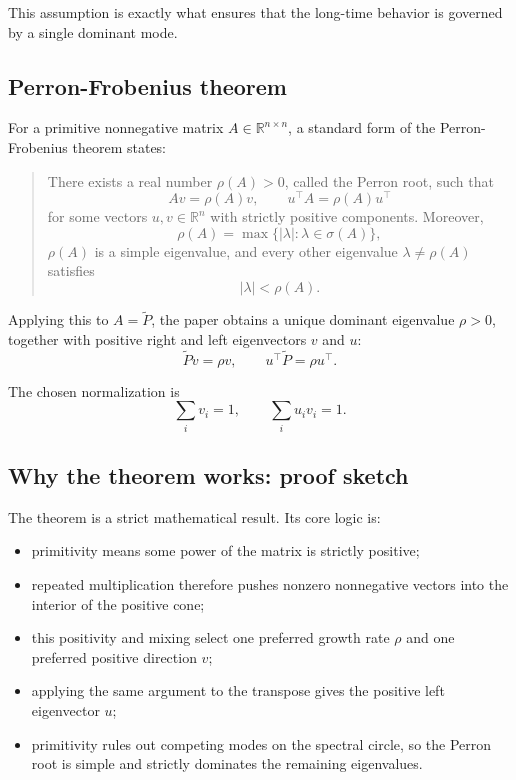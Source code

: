 \documentclass[11pt]{article}
\begin{document}
This assumption is exactly what ensures that the long-time behavior is governed by a single
dominant mode.

\subsection*{Perron-Frobenius theorem}

For a primitive nonnegative matrix \(A\in\mathbb{R}^{n\times n}\), a standard form of the
Perron-Frobenius theorem states:
\begin{quote}
There exists a real number \(\rho(A)>0\), called the Perron root, such that
\begin{equation}
    Av=\rho(A)v,
    \qquad
    u^\top A=\rho(A)u^\top
\end{equation}
for some vectors \(u,v\in\mathbb{R}^n\) with strictly positive components. Moreover,
\begin{equation}
    \rho(A)=\max\{|\lambda|:\lambda\in\sigma(A)\},
\end{equation}
\(\rho(A)\) is a simple eigenvalue, and every other eigenvalue \(\lambda\neq \rho(A)\)
satisfies
\begin{equation}
    |\lambda|<\rho(A).
\end{equation}
\end{quote}

Applying this to \(A=\widetilde{P}\), the paper obtains a unique dominant eigenvalue
\(\rho>0\), together with positive right and left eigenvectors \(v\) and \(u\):
\begin{equation}
    \widetilde{P}v=\rho v,
    \qquad
    u^\top\widetilde{P}=\rho u^\top.
\end{equation}

The chosen normalization is
\begin{equation}
    \sum_i v_i = 1,
    \qquad
    \sum_i u_i v_i = 1.
\end{equation}

\subsection*{Why the theorem works: proof sketch}

The theorem is a strict mathematical result. Its core logic is:
\begin{itemize}
    \item primitivity means some power of the matrix is strictly positive;
    \item repeated multiplication therefore pushes nonzero nonnegative vectors into the
    interior of the positive cone;
    \item this positivity and mixing select one preferred growth rate \(\rho\) and one
    preferred positive direction \(v\);
    \item applying the same argument to the transpose gives the positive left eigenvector
    \(u\);
    \item primitivity rules out competing modes on the spectral circle, so the Perron root is
    simple and strictly dominates the remaining eigenvalues.
\end{itemize}
\end{document}
